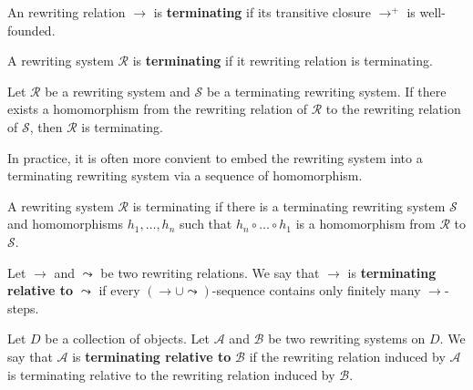 \begin{definition}
    \label{def:rewriting_relation:termination}
An rewriting relation $\to$ is \textbf{terminating} if its transitive closure $\to^+$ is well-founded.
\end{definition}

\begin{definition}
    \label{def:rewriting_system:termination}
    A rewriting system $\mathcal{R}$
     is \textbf{terminating} if it rewriting relation
      is terminating.
\end{definition}

\begin{proposition}
    Let $\mathcal{R}$ be a rewriting system and $\mathcal{S}$ be a terminating rewriting system.
    If there exists a homomorphism from the rewriting relation of $\mathcal{R}$ to the rewriting relation of $\mathcal{S}$, then $\mathcal{R}$ is terminating.  
\end{proposition}

In practice, it is often more convient to embed the rewriting system into a terminating rewriting system via a sequence of homomorphism.
\begin{corollary}
  A rewriting system $\mathcal{R}$ is terminating if there is a terminating rewriting system $\mathcal{S}$ and homomorphisms $h_1,\ldots, h_n$ such that $h_n \circ \ldots \circ h_1$ is a homomorphism from $\mathcal{R}$ to $\mathcal{S}$.
\end{corollary}

\begin{definition}
    \label{def:rewriting_relation:relative_termination}
    Let \( \to \) and \( \leadsto \) be two rewriting relations. We say that \(\to\) is \textbf{terminating relative to} \(\leadsto\) if every \( \left(\to \cup \leadsto \right) \)-sequence contains only finitely many \(\to\)-steps.
\end{definition}

\begin{definition}
    \label{def:rewriting_system:relative_termination}
    Let $D$ be a collection of objects.
    Let \( \mathcal{A} \) and \( \mathcal{B} \) be two rewriting systems on $D$. We say that \(\mathcal{A}\) is \textbf{terminating relative to} \(\mathcal{B}\) if the rewriting relation induced by \(\mathcal{A}\) is terminating relative to the rewriting relation induced by \(\mathcal{B}\).
\end{definition}

